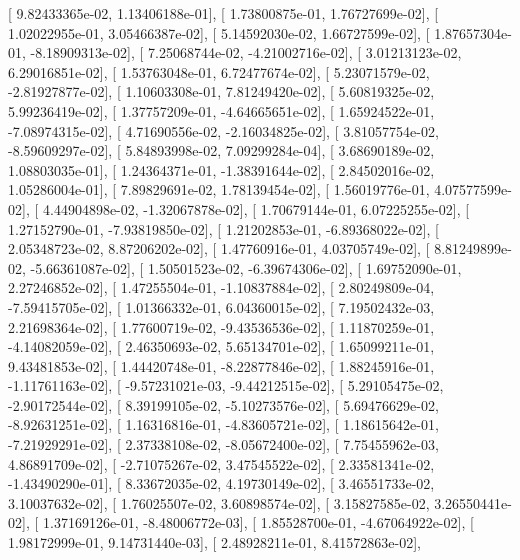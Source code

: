 \documentclass{article}
\begin{document}
       [  9.82433365e-02,   1.13406188e-01],
       [  1.73800875e-01,   1.76727699e-02],
       [  1.02022955e-01,   3.05466387e-02],
       [  5.14592030e-02,   1.66727599e-02],
       [  1.87657304e-01,  -8.18909313e-02],
       [  7.25068744e-02,  -4.21002716e-02],
       [  3.01213123e-02,   6.29016851e-02],
       [  1.53763048e-01,   6.72477674e-02],
       [  5.23071579e-02,  -2.81927877e-02],
       [  1.10603308e-01,   7.81249420e-02],
       [  5.60819325e-02,   5.99236419e-02],
       [  1.37757209e-01,  -4.64665651e-02],
       [  1.65924522e-01,  -7.08974315e-02],
       [  4.71690556e-02,  -2.16034825e-02],
       [  3.81057754e-02,  -8.59609297e-02],
       [  5.84893998e-02,   7.09299284e-04],
       [  3.68690189e-02,   1.08803035e-01],
       [  1.24364371e-01,  -1.38391644e-02],
       [  2.84502016e-02,   1.05286004e-01],
       [  7.89829691e-02,   1.78139454e-02],
       [  1.56019776e-01,   4.07577599e-02],
       [  4.44904898e-02,  -1.32067878e-02],
       [  1.70679144e-01,   6.07225255e-02],
       [  1.27152790e-01,  -7.93819850e-02],
       [  1.21202853e-01,  -6.89368022e-02],
       [  2.05348723e-02,   8.87206202e-02],
       [  1.47760916e-01,   4.03705749e-02],
       [  8.81249899e-02,  -5.66361087e-02],
       [  1.50501523e-02,  -6.39674306e-02],
       [  1.69752090e-01,   2.27246852e-02],
       [  1.47255504e-01,  -1.10837884e-02],
       [  2.80249809e-04,  -7.59415705e-02],
       [  1.01366332e-01,   6.04360015e-02],
       [  7.19502432e-03,   2.21698364e-02],
       [  1.77600719e-02,  -9.43536536e-02],
       [  1.11870259e-01,  -4.14082059e-02],
       [  2.46350693e-02,   5.65134701e-02],
       [  1.65099211e-01,   9.43481853e-02],
       [  1.44420748e-01,  -8.22877846e-02],
       [  1.88245916e-01,  -1.11761163e-02],
       [ -9.57231021e-03,  -9.44212515e-02],
       [  5.29105475e-02,  -2.90172544e-02],
       [  8.39199105e-02,  -5.10273576e-02],
       [  5.69476629e-02,  -8.92631251e-02],
       [  1.16316816e-01,  -4.83605721e-02],
       [  1.18615642e-01,  -7.21929291e-02],
       [  2.37338108e-02,  -8.05672400e-02],
       [  7.75455962e-03,   4.86891709e-02],
       [ -2.71075267e-02,   3.47545522e-02],
       [  2.33581341e-02,  -1.43490290e-01],
       [  8.33672035e-02,   4.19730149e-02],
       [  3.46551733e-02,   3.10037632e-02],
       [  1.76025507e-02,   3.60898574e-02],
       [  3.15827585e-02,   3.26550441e-02],
       [  1.37169126e-01,  -8.48006772e-03],
       [  1.85528700e-01,  -4.67064922e-02],
       [  1.98172999e-01,   9.14731440e-03],
       [  2.48928211e-01,   8.41572863e-02],
\end{document}
